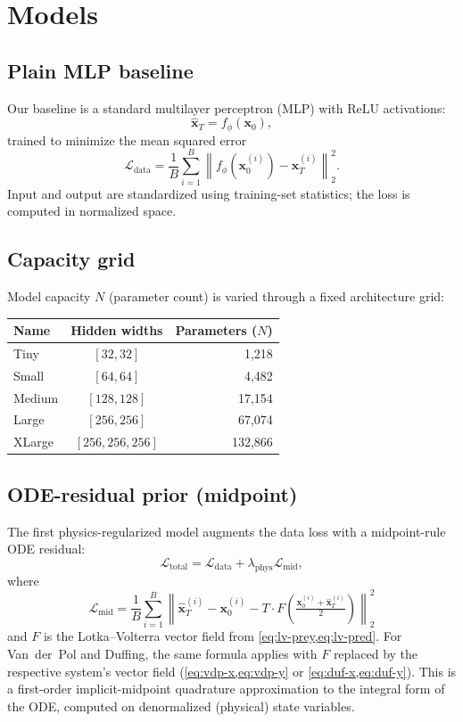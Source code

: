 \documentclass[11pt]{article}
\begin{document}
\section{Models}

\subsection{Plain MLP baseline}

Our baseline is a standard multilayer perceptron (MLP) with ReLU activations:
\[
\hat{\bm{x}}_T = f_\phi(\bm{x}_0),
\]
trained to minimize the mean squared error
\[
\mathcal{L}_{\mathrm{data}} = \frac{1}{B}\sum_{i=1}^{B} \left\| f_\phi(\bm{x}_0^{(i)}) - \bm{x}_T^{(i)} \right\|_2^2.
\]
Input and output are standardized using training-set statistics; the loss is computed in normalized space.

\subsection{Capacity grid}

Model capacity $N$ (parameter count) is varied through a fixed architecture grid:

\begin{center}
\begin{tabular}{lcr}
\toprule
Name & Hidden widths & Parameters ($N$) \\
\midrule
Tiny   & $[32, 32]$        & 1{,}218 \\
Small  & $[64, 64]$        & 4{,}482 \\
Medium & $[128, 128]$      & 17{,}154 \\
Large  & $[256, 256]$      & 67{,}074 \\
XLarge & $[256, 256, 256]$ & 132{,}866 \\
\bottomrule
\end{tabular}
\end{center}

\subsection{ODE-residual prior (midpoint)}
\label{sec:midpoint-prior}

The first physics-regularized model augments the data loss with a midpoint-rule ODE residual:
\[
\mathcal{L}_{\mathrm{total}} = \mathcal{L}_{\mathrm{data}} + \lambda_{\mathrm{phys}} \mathcal{L}_{\mathrm{mid}},
\]
where
\[
\mathcal{L}_{\mathrm{mid}} = \frac{1}{B}\sum_{i=1}^{B} \left\| \hat{\bm{x}}_T^{(i)} - \bm{x}_0^{(i)} - T \cdot F\!\left(\tfrac{\bm{x}_0^{(i)} + \hat{\bm{x}}_T^{(i)}}{2}\right) \right\|_2^2
\]
and $F$ is the Lotka--Volterra vector field from \cref{eq:lv-prey,eq:lv-pred}.
For Van~der~Pol and Duffing, the same formula applies with $F$ replaced by the respective system's vector field (\cref{eq:vdp-x,eq:vdp-y} or \cref{eq:duf-x,eq:duf-y}).
This is a first-order implicit-midpoint quadrature approximation to the integral form of the ODE, computed on denormalized (physical) state variables.
\end{document}
